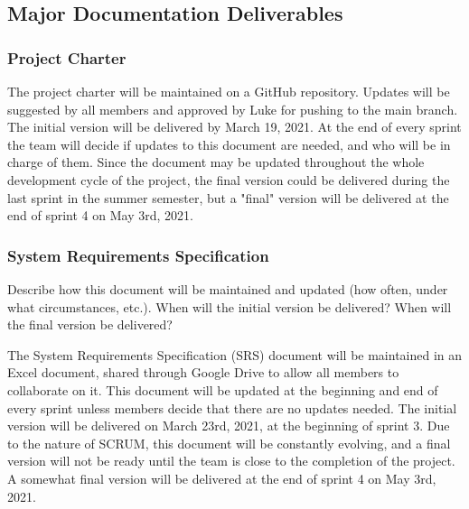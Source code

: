 
\subsection{Major Documentation Deliverables}

\subsubsection{Project Charter}

The project charter will be maintained on a GitHub repository. Updates will be suggested by all members and approved by Luke for pushing to the main branch. The initial version will be delivered by March 19, 2021. At the end of every sprint the team will decide if updates to this document are needed, and who will be in charge of them. Since the document may be updated throughout the whole development cycle of the project, the final version could be delivered during the last sprint in the summer semester, but a "final" version will be delivered at the end of sprint 4 on May 3rd, 2021.

\subsubsection{System Requirements Specification}
Describe how this document will be maintained and updated (how often, under what circumstances, etc.). When will the initial version be delivered? When will the final version be delivered?

The System Requirements Specification (SRS) document will be maintained in an Excel document, shared through Google Drive to allow all members to collaborate on it. This document will be updated at the beginning and end of every sprint unless members decide that there are no updates needed. The initial version will be delivered on March 23rd, 2021, at the beginning of sprint 3. Due to the nature of SCRUM, this document will be constantly evolving, and a final version will not be ready until the team is close to the completion of the project. A somewhat final version will be delivered at the end of sprint 4 on May 3rd, 2021.

